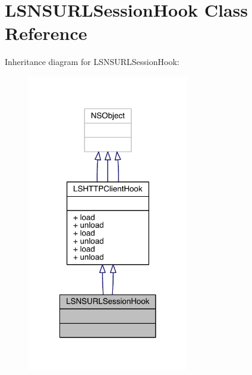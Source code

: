 \hypertarget{interface_l_s_n_s_u_r_l_session_hook}{\section{L\-S\-N\-S\-U\-R\-L\-Session\-Hook Class Reference}
\label{interface_l_s_n_s_u_r_l_session_hook}
}


Inheritance diagram for L\-S\-N\-S\-U\-R\-L\-Session\-Hook\-:\nopagebreak
\begin{figure}[H]
\begin{center}
\leavevmode
\includegraphics[width=200pt]{interface_l_s_n_s_u_r_l_session_hook__inherit__graph}
\end{center}
\end{figure}


